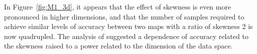 \FloatBarrier
In Figure~\ref{fig:M1_3d}, it appears that the effect of skewness is even more pronounced in higher dimensions, and that the number of samples required to achieve similar levels of accuracy between two maps with a ratio of skewness 2 is now quadrupled.
The analysis of \cite{BGE+15} suggested a dependence of accuracy related to the skewness raised to a power related to the dimension of the data space.



